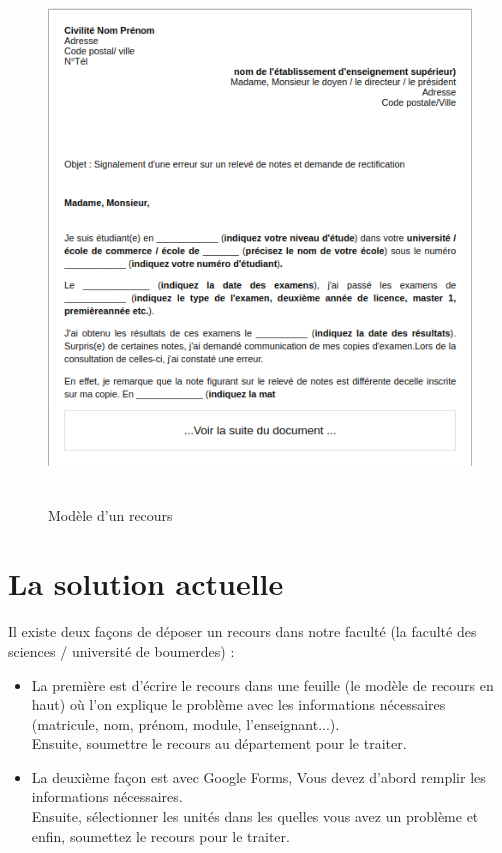 \documentclass[12pt]{report}
\begin{document}
\begin{figure}[h]
\centering
    \includegraphics[width = 6in, height = 5.5in]{../Images/ModeleRecours.png}
\caption{Modèle d’un recours}
\end{figure}

\newpage

\section{La solution actuelle}
Il existe deux façons de déposer un recours dans notre faculté (la faculté des sciences / université de boumerdes) :
\begin{itemize}
    \item La première est d'écrire le recours dans une feuille (le modèle de recours en haut) où l'on explique le problème avec les informations nécessaires (matricule, nom, prénom, module, l'enseignant...).\\Ensuite, soumettre le recours au département pour le traiter.
    \item La deuxième façon est avec Google Forms, Vous devez d'abord remplir les informations nécessaires.\\Ensuite, sélectionner les unités dans les quelles vous avez un problème et enfin, soumettez le recours pour le traiter.
\end{itemize}
\end{document}
